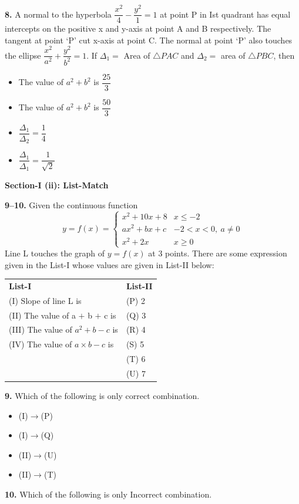 \documentclass[10pt,twocolumn]{extarticle}
\renewcommand{\arraystretch}{1.15}
\newenvironment{qoptions}{\begin{itemize}[leftmargin=1.8em,itemsep=2pt,topsep=2pt,label={}]}{\end{itemize}}
\newcommand{\opt}[2]{\item[({#1})] {#2}}
\newcommand{\subsectionhdr}[1]{\par\vspace{3pt}\noindent\textbf{#1}\par\vspace{2pt}}
\begin{document}
\textbf{8.} A normal to the hyperbola $\dfrac{x^2}{4}-\dfrac{y^2}{1}=1$ at point P in Ist quadrant has equal intercepts on the positive x and y-axis at point A and B respectively. The tangent at point `P' cut x-axis at point C. The normal at point `P' also touches the ellipse $\dfrac{x^2}{a^2}+\dfrac{y^2}{b^2}=1$. If $\Delta_1=$ Area of $\triangle PAC$ and $\Delta_2=$ area of $\triangle PBC$, then

\begin{qoptions}
\opt{A}{The value of $a^2+b^2$ is $\dfrac{25}{3}$}
\opt{B}{The value of $a^2+b^2$ is $\dfrac{50}{3}$}
\opt{C}{$\dfrac{\Delta_1}{\Delta_2}=\dfrac14$}
\opt{D}{$\dfrac{\Delta_1}{\Delta_1}=\dfrac{1}{\sqrt2}$}
\end{qoptions}

\subsectionhdr{Section-I (ii): List-Match}

\textbf{9--10.} Given the continuous function
\[y=f(x)=\begin{cases}x^2+10x+8 & x\le-2\\ ax^2+bx+c & -2<x<0,\ a\ne0\\ x^2+2x & x\ge0\end{cases}\]
Line L touches the graph of $y=f(x)$ at 3 points. There are some expression given in the List-I whose values are given in List-II below:

\begin{center}
\renewcommand{\arraystretch}{1.25}
\begin{tabular}{@{}ll@{}}
\textbf{List-I} & \textbf{List-II}\\
(I) Slope of line L is & (P) 2\\
(II) The value of a $+$ b $+$ c is & (Q) 3\\
(III) The value of $a^2+b-c$ is & (R) 4\\
(IV) The value of $a\times b-c$ is & (S) 5\\
& (T) 6\\
& (U) 7\\
\end{tabular}
\renewcommand{\arraystretch}{1.15}
\end{center}

\textbf{9.} Which of the following is only correct combination.

\begin{qoptions}
\opt{A}{(I)$\to$(P)}
\opt{B}{(I)$\to$(Q)}
\opt{C}{(II)$\to$(U)}
\opt{D}{(II)$\to$(T)}
\end{qoptions}

\textbf{10.} Which of the following is only Incorrect combination.
\end{document}
